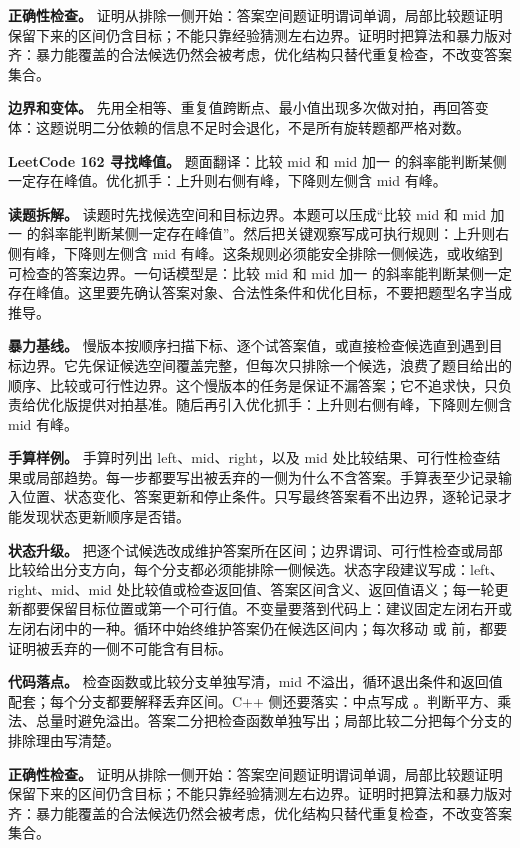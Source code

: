 \textbf{正确性检查。} 证明从排除一侧开始：答案空间题证明谓词单调，局部比较题证明保留下来的区间仍含目标；不能只靠经验猜测左右边界。证明时把算法和暴力版对齐：暴力能覆盖的合法候选仍然会被考虑，优化结构只替代重复检查，不改变答案集合。

\textbf{边界和变体。} 先用全相等、重复值跨断点、最小值出现多次做对拍，再回答变体：这题说明二分依赖的信息不足时会退化，不是所有旋转题都严格对数。

\noindent\textbf{LeetCode 162 寻找峰值。} 题面翻译：比较 mid 和 mid 加一 的斜率能判断某侧一定存在峰值。优化抓手：上升则右侧有峰，下降则左侧含 mid 有峰。

\textbf{读题拆解。} 读题时先找候选空间和目标边界。本题可以压成“比较 mid 和 mid 加一 的斜率能判断某侧一定存在峰值”。然后把关键观察写成可执行规则：上升则右侧有峰，下降则左侧含 mid 有峰。这条规则必须能安全排除一侧候选，或收缩到可检查的答案边界。一句话模型是：比较 mid 和 mid 加一 的斜率能判断某侧一定存在峰值。这里要先确认答案对象、合法性条件和优化目标，不要把题型名字当成推导。

\textbf{暴力基线。} 慢版本按顺序扫描下标、逐个试答案值，或直接检查候选直到遇到目标边界。它先保证候选空间覆盖完整，但每次只排除一个候选，浪费了题目给出的顺序、比较或可行性边界。这个慢版本的任务是保证不漏答案；它不追求快，只负责给优化版提供对拍基准。随后再引入优化抓手：上升则右侧有峰，下降则左侧含 mid 有峰。

\textbf{手算样例。} 手算时列出 left、mid、right，以及 mid 处比较结果、可行性检查结果或局部趋势。每一步都要写出被丢弃的一侧为什么不含答案。手算表至少记录输入位置、状态变化、答案更新和停止条件。只写最终答案看不出边界，逐轮记录才能发现状态更新顺序是否错。

\textbf{状态升级。} 把逐个试候选改成维护答案所在区间；边界谓词、可行性检查或局部比较给出分支方向，每个分支都必须能排除一侧候选。状态字段建议写成：left、right、mid、mid 处比较值或检查返回值、答案区间含义、返回值语义；每一轮更新都要保留目标位置或第一个可行值。不变量要落到代码上：建议固定左闭右开或左闭右闭中的一种。循环中始终维护答案仍在候选区间内；每次移动  或  前，都要证明被丢弃的一侧不可能含有目标。

\textbf{代码落点。} 检查函数或比较分支单独写清，mid 不溢出，循环退出条件和返回值配套；每个分支都要解释丢弃区间。C++ 侧还要落实：中点写成 。判断平方、乘法、总量时避免溢出。答案二分把检查函数单独写出；局部比较二分把每个分支的排除理由写清楚。

\textbf{正确性检查。} 证明从排除一侧开始：答案空间题证明谓词单调，局部比较题证明保留下来的区间仍含目标；不能只靠经验猜测左右边界。证明时把算法和暴力版对齐：暴力能覆盖的合法候选仍然会被考虑，优化结构只替代重复检查，不改变答案集合。

